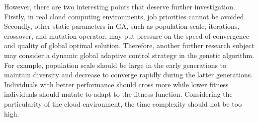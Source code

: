 However, there are two interesting points that deserve further investigation. Firstly, in real cloud computing environments, job priorities cannot be avoided. 
Secondly, other static parameters in GA, such as population scale, iterations, crossover, and mutation operator, may put pressure on the speed of convergence and 
quality of global optimal solution. Therefore, another further research subject may consider a dynamic global adaptive control strategy in the genetic algorithm. 
For example, population scale should be large in the early generations to maintain diversity and decrease to converge rapidly during the latter generations. 
Individuals with better performance should cross more while lower fitness individuals should mutate to adapt to the fitness function. 
Considering the particularity of the cloud environment, the time complexity should not be too high.~\cite{wang2014load}

\newpage
